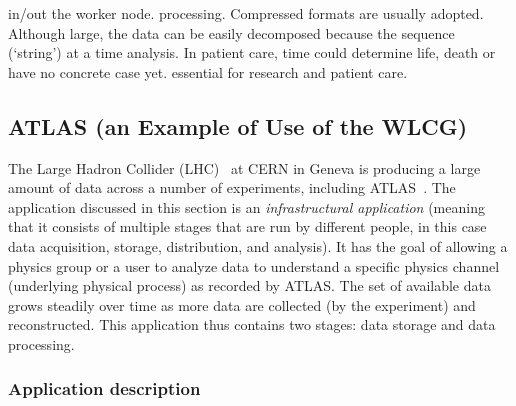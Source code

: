 \documentclass[times]{cpeauth}
\newcommand{\alnote}[1]{ {\textcolor{darkgreen} { ***Andre: #1 }}}
\begin{document}
%
in/out the worker node.
%
processing. Compressed formats are usually adopted. Although %
large, the data can be easily decomposed because the %
sequence (`string') at a time
%
%
analysis.  In patient care, time could determine life, death or %
have no concrete case yet.
%
essential for research and patient care.

\subsection{ATLAS (an Example of Use of the WLCG) \label{WLCGSteve}}

%



The Large Hadron Collider (LHC)~\cite{lhc} at CERN in Geneva is producing a
large amount of data across a number of experiments, including
ATLAS~\cite{atlas}. The application discussed in this section is an {\em
infrastructural application} (meaning that it consists of multiple stages that
are run by different people, in this case data acquisition, storage,
distribution, and analysis). It has the goal of allowing a physics group or a
user to analyze data to understand a specific physics channel (underlying
physical process) as recorded by ATLAS.  The set of available data grows
steadily over time as more data are collected (by the experiment) and
reconstructed. This application thus contains two stages: data storage and data
processing.  %

\subsubsection*{Application description} %
\end{document}

